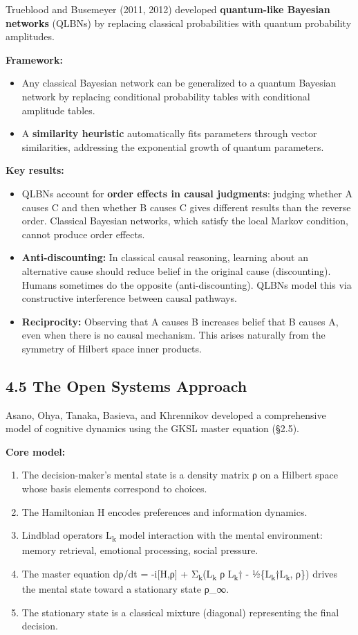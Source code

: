 \documentclass[11pt]{article}
\begin{document}
Trueblood and Busemeyer (2011, 2012) developed \textbf{quantum-like Bayesian networks}
(QLBNs) by replacing classical probabilities with quantum probability amplitudes.

\textbf{Framework:}
\begin{itemize}
\item Any classical Bayesian network can be generalized to a quantum Bayesian network
by replacing conditional probability tables with conditional amplitude tables.
\item A \textbf{similarity heuristic} automatically fits parameters through vector
similarities, addressing the exponential growth of quantum parameters.
\end{itemize}

\textbf{Key results:}
\begin{itemize}
\item QLBNs account for \textbf{order effects in causal judgments}: judging whether A causes
C and then whether B causes C gives different results than the reverse order.
Classical Bayesian networks, which satisfy the local Markov condition, cannot
produce order effects.
\item \textbf{Anti-discounting:} In classical causal reasoning, learning about an alternative
cause should reduce belief in the original cause (discounting). Humans sometimes
do the opposite (anti-discounting). QLBNs model this via constructive
interference between causal pathways.
\item \textbf{Reciprocity:} Observing that A causes B increases belief that B causes A, even
when there is no causal mechanism. This arises naturally from the symmetry of
Hilbert space inner products.
\end{itemize}
\subsection{4.5 The Open Systems Approach}
\label{sec:orga5b3af6}

Asano, Ohya, Tanaka, Basieva, and Khrennikov developed a comprehensive model
of cognitive dynamics using the GKSL master equation (§2.5).

\textbf{Core model:}
\begin{enumerate}
\item The decision-maker's mental state is a density matrix ρ on a Hilbert space
whose basis elements correspond to choices.
\item The Hamiltonian H encodes preferences and information dynamics.
\item Lindblad operators L\textsubscript{k} model interaction with the mental environment:
memory retrieval, emotional processing, social pressure.
\item The master equation dρ/dt = -i[H,ρ] + Σ\textsubscript{k}(L\textsubscript{k} ρ L\textsubscript{k}† - ½\{L\textsubscript{k}†L\textsubscript{k}, ρ\})
drives the mental state toward a stationary state ρ\_∞.
\item The stationary state is a classical mixture (diagonal) representing the
final decision.
\end{enumerate}
\end{document}
